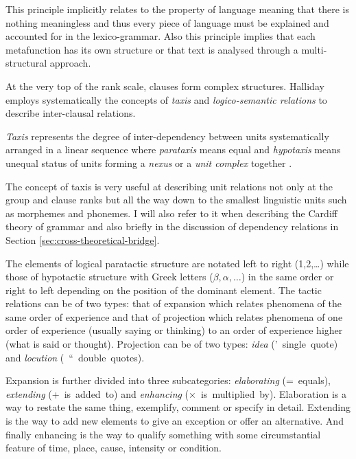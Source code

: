 This principle implicitly relates to the property of language meaning that 
there is nothing meaningless and thus every piece of language must be explained and accounted for in the lexico-grammar. Also this principle implies that each metafunction has its own structure or that text is analysed through a multi-structural approach.

At the very top of the rank scale, clauses form complex structures. Halliday employs systematically the concepts of \textit{taxis} and \textit{logico-semantic relations} to describe inter-clausal relations. 

\begin{definition}[Taxis]\label{def:taxis}
    \textit{Taxis} represents the degree of inter-dependency between units systematically arranged in a linear sequence where \textit{parataxis} means equal and \textit{hypotaxis} means unequal status of units forming a \textit{nexus} or a \textit{unit complex} together \citep[440]{ifg4}.
\end{definition}

The concept of taxis is very useful at describing unit relations not only at the group and clause ranks but all the way down to the smallest linguistic units such as morphemes and phonemes. I will also refer to it when describing the Cardiff theory of grammar and also briefly in the discussion of dependency relations in Section \ref{sec:cross-theoretical-bridge}.

The elements of logical paratactic structure are notated left to right (1,2,\dots) while those of hypotactic structure with Greek letters ($\beta, \alpha, \dots$) in the same order or right to left depending on the position of the dominant element. The tactic relations can be of two types: that of expansion which relates phenomena of the same order of experience and that of projection which relates phenomena of one order of experience (usually saying or thinking) to an order of experience higher (what is said or thought). Projection can be of two types: \textit{idea} \mbox{(' single quote)} and \textit{locution} \mbox{( `` double quotes)}.

Expansion is further divided into three subcategories: \textit{elaborating} \mbox{(= equals)}, \textit{extending} \mbox{(+ is added to)} and \textit{enhancing} \mbox{($\times$ is multiplied by)}. Elaboration is a way to restate the same thing, exemplify, comment or specify in detail. Extending is the way to add new elements to give an exception or offer an alternative. And finally enhancing is the way to qualify something with some circumstantial feature of time, place, cause, intensity or condition. 

